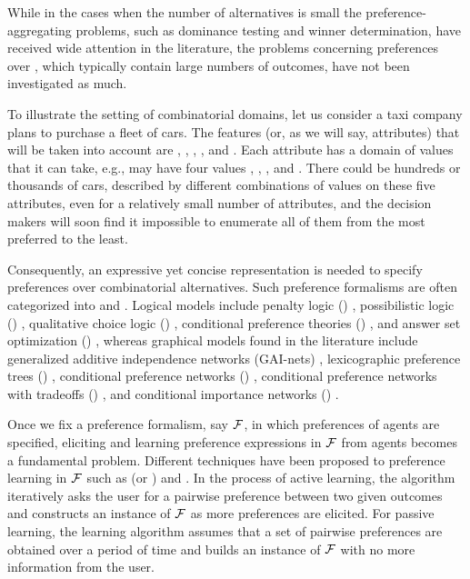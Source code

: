 While in the cases when the
number of alternatives is small the preference-aggregating 
problems, such as dominance testing and winner determination,
have received wide attention in the literature,
the problems concerning preferences over , which typically contain large numbers of outcomes, 
have not been investigated as much.

To illustrate the setting of combinatorial domains, let us consider
a taxi company plans to purchase a fleet of cars.
The features (or, as we will say, attributes) that will be
taken into account are , ,
, , and .  
Each attribute has a domain of values that it can take, e.g.,
 may have four values , , , and .
There could be hundreds or thousands of cars,
described by different combinations of values on these five attributes, 
even for a relatively small number of attributes, and
the decision makers will soon find it impossible to enumerate all of
them from the most preferred to the least.

Consequently, an expressive yet concise representation is needed to specify
preferences over combinatorial alternatives.
Such preference formalisms are often categorized into  and
.
Logical models include penalty logic () \cite{haddawy1992representations}, 
possibilistic logic () \cite{DuboisLP91},
qualitative choice logic () \cite{brewka2004qualitative},
conditional preference theories () \cite{Wilson04extendingcp-nets},
and answer set optimization () \cite{Brewka:ASO},
whereas graphical models found in the literature include
generalized additive independence networks (GAI-nets) \cite{BacchusG95,LIP61766},
lexicographic preference trees () \cite{booth:learningLP,conf/adt13/LiuT},
conditional preference networks () \cite{Kaci:Pref},
conditional preference networks with tradeoffs () \cite{BrafmanD02:TCP},
and conditional importance networks () \cite{Kaci:Pref}.

Once we fix a preference formalism, say $\mathcal{F}$, in which preferences of agents
are specified, eliciting and learning preference expressions in $\mathcal{F}$ from agents
becomes a fundamental problem.
Different techniques have been proposed to preference learning
in $\mathcal{F}$
such as  (or ) and 
 \cite{Furnkranz:pref_learning}.
In the process of
active learning, the algorithm iteratively asks the user for a pairwise 
preference between two given outcomes and constructs
an instance of $\mathcal{F}$ as more preferences are elicited.
For passive learning, the learning algorithm assumes that a set of
pairwise preferences are obtained over a period of time and builds an instance
of $\mathcal{F}$ with no more information from the user.

